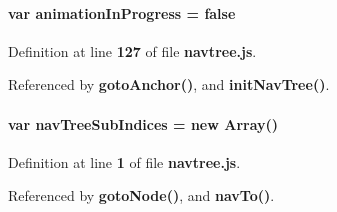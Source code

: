\paragraph[{animation\+In\+Progress}]{\setlength{\rightskip}{0pt plus 5cm}var animation\+In\+Progress = false}\label{navtree_8js_a588cb5a5004d817923eb3f45c8f0f7c7}


Definition at line {\bf 127} of file {\bf navtree.\+js}.



Referenced by {\bf goto\+Anchor()}, and {\bf init\+Nav\+Tree()}.

\paragraph[{nav\+Tree\+Sub\+Indices}]{\setlength{\rightskip}{0pt plus 5cm}var nav\+Tree\+Sub\+Indices = new Array()}\label{navtree_8js_aee39e0d4ab2646ada03125bd7e750cf7}


Definition at line {\bf 1} of file {\bf navtree.\+js}.



Referenced by {\bf goto\+Node()}, and {\bf nav\+To()}.

